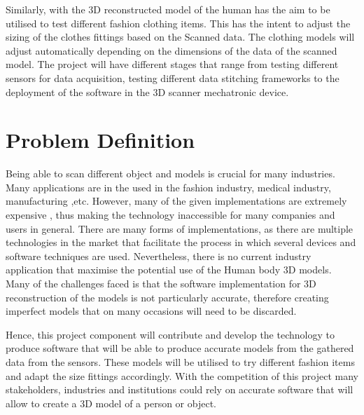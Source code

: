 \documentclass[12pt]{report}
\begin{document}
Similarly, with the 3D reconstructed model of the human has the aim to be utilised to test different fashion clothing items. This has the intent to adjust the sizing of the clothes fittings based on the Scanned data. The clothing models will adjust automatically depending on the dimensions of the data of the scanned model. 
The project will have different stages that range from testing different sensors for data acquisition, testing different data stitching frameworks to the deployment of the software in the 3D scanner mechatronic device.

\section{Problem Definition}
Being able to scan different object and models is crucial for many industries. Many applications are in the used in the fashion industry, medical industry, manufacturing ,etc. However, many of the given implementations are extremely expensive , thus making the technology inaccessible for many companies and users in general. 
There are many forms of implementations, as there are multiple technologies in the market that facilitate the process in which several devices and software techniques are used. Nevertheless, there is no current industry application that maximise the potential use of the Human body 3D models.
Many of the challenges faced is that the software implementation for 3D reconstruction of the models is not particularly accurate, therefore creating imperfect models that on many occasions will need to be discarded.

Hence, this project component will contribute and develop the technology to produce software that will be able to produce accurate models from the gathered data from the sensors. These models will be utilised to try different fashion items and adapt the size fittings accordingly. 
With the competition of this project many stakeholders, industries and institutions could rely on accurate software that will  allow to create a 3D model of a person or object.
\end{document}

